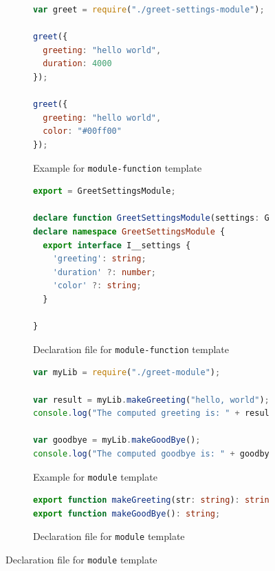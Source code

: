 \documentclass[english,cleveref,autoref,submission]{programming}
\begin{document}
\begin{figure}[tp]
  \centering
  \begin{subfigure}{0.48\linewidth}
    \begin{lstlisting}[language=JavaScript,numbers=none]
var greet = require("./greet-settings-module");

greet({
  greeting: "hello world",
  duration: 4000
});

greet({
  greeting: "hello world",
  color: "#00ff00"
});
    \end{lstlisting}
    \caption{Example for \texttt{module-function} template}
    \label{fig:example-module-function}
  \end{subfigure}
  \hfill
  \begin{subfigure}{0.48\linewidth}
    \begin{lstlisting}[language=TypeScript,numbers=none]
export = GreetSettingsModule;

declare function GreetSettingsModule(settings: GreetSettingsModule.I__settings): void;
declare namespace GreetSettingsModule {
  export interface I__settings {
    'greeting': string;
    'duration' ?: number;
    'color' ?: string;
  }

}
    \end{lstlisting}
    \caption{Declaration file for \texttt{module-function} template}
    \label{fig:template-module-function}
  \end{subfigure}

  \begin{subfigure}{0.48\linewidth}
      \begin{lstlisting}[language=JavaScript,numbers=none]
var myLib = require("./greet-module");

var result = myLib.makeGreeting("hello, world");
console.log("The computed greeting is: " + result);

var goodbye = myLib.makeGoodBye();
console.log("The computed goodbye is: " + goodbye);    
      \end{lstlisting}
    \caption{Example for \texttt{module} template}
    \label{fig:example-module}
    \end{subfigure}
    \hfill
    \begin{subfigure}{0.48\linewidth}
      \begin{lstlisting}[language=TypeScript,numbers=none]
export function makeGreeting(str: string): string;
export function makeGoodBye(): string;        
      \end{lstlisting}
      \caption{Declaration file for \texttt{module} template}
      \label{fig:template-module}
    \end{subfigure}


\end{figure}
\end{document}
